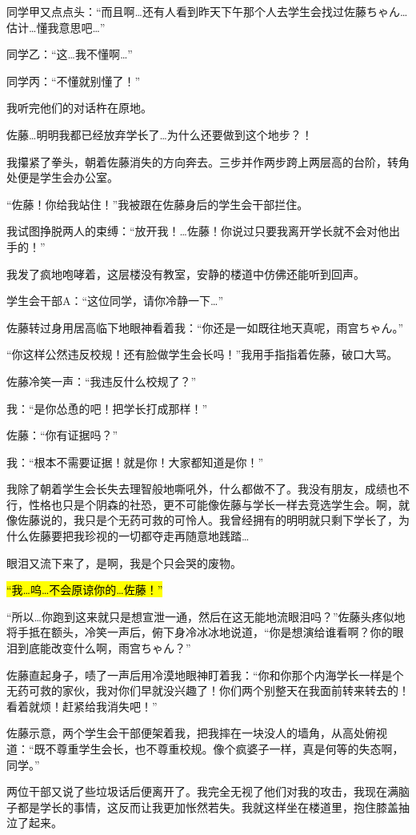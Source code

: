 同学甲又点点头：“而且啊…还有人看到昨天下午那个人去学生会找过佐藤ちゃん…估计…懂我意思吧…”

同学乙：“这…我不懂啊…”

同学丙：“不懂就别懂了！”

我听完他们的对话杵在原地。

佐藤…明明我都已经放弃学长了…为什么还要做到这个地步？！

我攥紧了拳头，朝着佐藤消失的方向奔去。三步并作两步跨上两层高的台阶，转角处便是学生会办公室。

“佐藤！你给我站住！”我被跟在佐藤身后的学生会干部拦住。

我试图挣脱两人的束缚：“放开我！…佐藤！你说过只要我离开学长就不会对他出手的！”

我发了疯地咆哮着，这层楼没有教室，安静的楼道中仿佛还能听到回声。

学生会干部A：“这位同学，请你冷静一下…”

佐藤转过身用居高临下地眼神看着我：“你还是一如既往地天真呢，雨宫ちゃん。”

“你这样公然违反校规！还有脸做学生会长吗！”我用手指指着佐藤，破口大骂。

佐藤冷笑一声：“我违反什么校规了？”

我：“是你怂恿的吧！把学长打成那样！”

佐藤：“你有证据吗？”

我：“根本不需要证据！就是你！大家都知道是你！”

我除了朝着学生会长失去理智般地嘶吼外，什么都做不了。我没有朋友，成绩也不行，性格也只是个阴森的社恐，更不可能像佐藤与学长一样去竞选学生会。啊，就像佐藤说的，我只是个无药可救的可怜人。我曾经拥有的明明就只剩下学长了，为什么佐藤要把我珍视的一切都夺走再随意地践踏…

眼泪又流下来了，是啊，我是个只会哭的废物。

\hl{“我…呜…不会原谅你的…佐藤！”}

“所以…你跑到这来就只是想宣泄一通，然后在这无能地流眼泪吗？”佐藤头疼似地将手抵在额头，冷笑一声后，俯下身冷冰冰地说道，“你是想演给谁看啊？你的眼泪到底能改变什么啊，雨宫ちゃん？”

佐藤直起身子，啧了一声后用冷漠地眼神盯着我：“你和你那个内海学长一样是个无药可救的家伙，我对你们早就没兴趣了！你们两个别整天在我面前转来转去的！看着就烦！赶紧给我消失吧！”

佐藤示意，两个学生会干部便架着我，把我摔在一块没人的墙角，从高处俯视道：“既不尊重学生会长，也不尊重校规。像个疯婆子一样，真是何等的失态啊，同学。”

两位干部又说了些垃圾话后便离开了。我完全无视了他们对我的攻击，我现在满脑子都是学长的事情，这反而让我更加怅然若失。我就这样坐在楼道里，抱住膝盖抽泣了起来。

